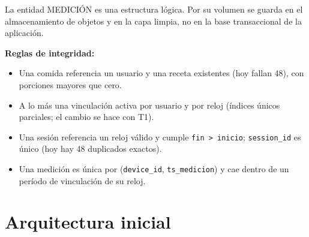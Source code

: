 \documentclass[11pt]{article}
\newcommand{\codigo}[1]{\texttt{\small #1}}
\begin{document}
La entidad MEDICIÓN es una estructura lógica. Por su volumen se
guarda en el almacenamiento de objetos y en la capa limpia, no en la
base transaccional de la aplicación.

\textbf{Reglas de integridad:}
\begin{itemize}
    \item Una comida referencia un usuario y una receta existentes
    (hoy fallan 48), con porciones mayores que cero.
    \item A lo más una vinculación activa por usuario y por reloj
    (índices únicos parciales; el cambio se hace con T1).
    \item Una sesión referencia un reloj válido y cumple
    \codigo{fin > inicio}; \codigo{session\_id} es único (hoy hay 48
    duplicados exactos).
    \item Una medición es única por (\codigo{device\_id},
    \codigo{ts\_medicion}) y cae dentro de un período de vinculación
    de su reloj.
\end{itemize}

\clearpage
\section{Arquitectura inicial}\label{an:arq}
\end{document}
